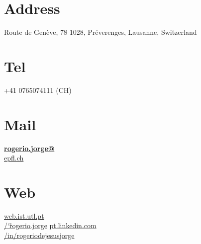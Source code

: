 \documentclass[]{friggeri-cv}
\begin{document}
      

\begin{aside}
  \section{Address}
    Route de Genève, 78 1028, Préverenges, Lausanne, Switzerland
    ~
    ~
    ~
  \section{Tel}
    +41 0765074111 (CH)
    ~
  \section{Mail}
    \href{mailto:rogerio.jorge@epfl.ch}{\textbf{rogerio.jorge@}\\epfl.ch}
    ~
  \section{Web}
    \href{http://web.ist.utl.pt/~rogerio.jorge}{web.ist.utl.pt\\/\char`\~rogerio.jorge}
    \href{https://pt.linkedin.com/in/rogeriodejesusjorge}{pt.linkedin.com\\/in/rogeriodejesusjorge}
    ~

\end{aside}
\end{document}
